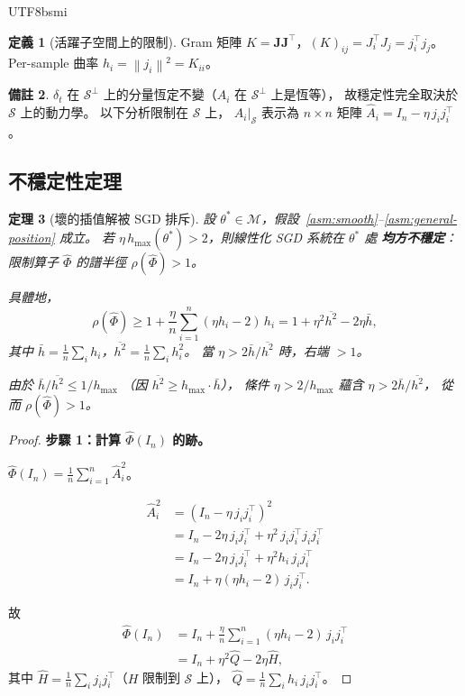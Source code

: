 \documentclass[11pt,a4paper]{article}
\newtheorem{theorem}{定理}
\theoremstyle{definition}
\newtheorem{definition}[theorem]{定義}
\newtheorem{remark}[theorem]{備註}
\newcommand{\cM}{\mathcal{M}}
\newcommand{\cS}{\mathcal{S}}
\newcommand{\bJ}{\mathbf{J}}
\newcommand{\norm}[1]{\left\|#1\right\|}
\begin{document}
\begin{CJK}{UTF8}{bsmi}
\begin{definition}[活躍子空間上的限制]
  Gram 矩陣 $K = \bJ\bJ^\top$，$(K)_{ij} = J_i^\top J_j = j_i^\top j_j$。
  Per-sample 曲率 $h_i = \norm{j_i}^2 = K_{ii}$。
\end{definition}

\begin{remark}
  $\delta_t$ 在 $\cS^\perp$ 上的分量恆定不變（$A_i$ 在 $\cS^\perp$ 上是恆等），
  故穩定性完全取決於 $\cS$ 上的動力學。
  以下分析限制在 $\cS$ 上，
  $A_i|_\cS$ 表示為 $n \times n$ 矩陣 $\hat{A}_i = I_n - \eta\,j_i j_i^\top$。
\end{remark}

\subsection{不穩定性定理}

\begin{theorem}[壞的插值解被 SGD 排斥]\label{thm:instability}
  設 $\theta^* \in \cM$，假設~\ref{asm:smooth}--\ref{asm:general-position} 成立。
  若 $\eta\,h_{\max}(\theta^*) > 2$，則線性化 SGD 系統在 $\theta^*$ 處
  \textbf{均方不穩定}：限制算子 $\hat\Phi$ 的譜半徑 $\rho(\hat\Phi) > 1$。

  具體地，
  \[
    \rho(\hat\Phi) \geq 1 + \frac{\eta}{n}\sum_{i=1}^n (\eta h_i - 2)\,h_i
    = 1 + \eta^2\overline{h^2} - 2\eta\bar{h},
  \]
  其中 $\bar{h} = \frac{1}{n}\sum_i h_i$，$\overline{h^2} = \frac{1}{n}\sum_i h_i^2$。
  當 $\eta > 2\bar{h}/\overline{h^2}$ 時，右端 $> 1$。

  由於 $\bar{h}/\overline{h^2} \leq 1/h_{\max}$
  （因 $\overline{h^2} \geq h_{\max}\cdot\bar{h}$），
  條件 $\eta > 2/h_{\max}$ 蘊含 $\eta > 2\bar{h}/\overline{h^2}$，
  從而 $\rho(\hat\Phi) > 1$。
\end{theorem}

\begin{proof}
  \textbf{步驟 1：計算 $\hat\Phi(I_n)$ 的跡。}

  $\hat\Phi(I_n) = \frac{1}{n}\sum_{i=1}^n \hat{A}_i^2$。

  \begin{align*}
    \hat{A}_i^2
    &= (I_n - \eta\,j_i j_i^\top)^2 \\
    &= I_n - 2\eta\,j_i j_i^\top + \eta^2\,j_i j_i^\top j_i j_i^\top \\
    &= I_n - 2\eta\,j_i j_i^\top + \eta^2 h_i\,j_i j_i^\top \\
    &= I_n + \eta(\eta h_i - 2)\,j_i j_i^\top.
  \end{align*}

  故
  \begin{align*}
    \hat\Phi(I_n)
    &= I_n + \frac{\eta}{n}\sum_{i=1}^n (\eta h_i - 2)\,j_i j_i^\top \\
    &= I_n + \eta^2\hat{Q} - 2\eta\hat{H},
  \end{align*}
  其中 $\hat{H} = \frac{1}{n}\sum_i j_i j_i^\top$（$H$ 限制到 $\cS$ 上），
  $\hat{Q} = \frac{1}{n}\sum_i h_i\,j_i j_i^\top$。


\end{proof}
\end{CJK}
\end{document}

